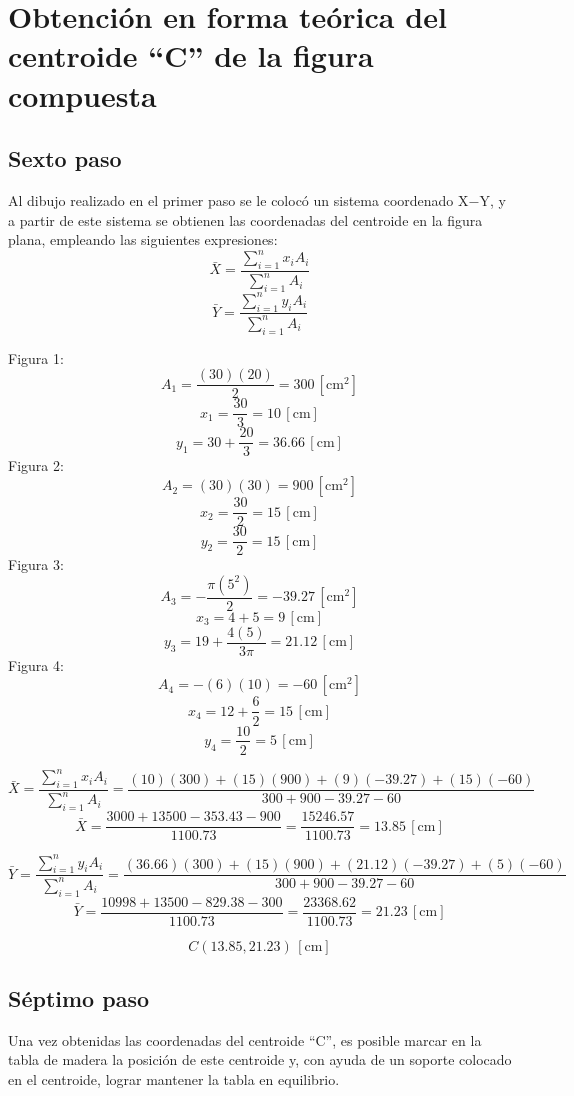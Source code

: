 \documentclass[12pt, titlepage]{report}
\newcommand{\unit}[1]{\ensuremath{\, \mathrm{#1}}}
\begin{document}
    \hfill
    \section{Obtención en forma teórica del centroide ``C'' de la figura compuesta}
    \subsection*{Sexto paso}
    Al dibujo realizado en el primer paso se le colocó un sistema coordenado X$-$Y, y a partir de este sistema se obtienen las coordenadas del centroide en la figura plana, empleando las siguientes expresiones:
    $$\bar{X}=\frac{\sum_{i= 1}^{n} x_{i}A_{i}}{\sum_{i= 1}^{n}A_{i}}$$
    $$\bar{Y}=\frac{\sum_{i= 1}^{n} y_{i}A_{i}}{\sum_{i= 1}^{n}A_{i}}$$

    Figura 1:
    $$A_{1}=\frac{(30)(20)}{2}=300 \unit{[cm^2]}$$
    $$x_{1}=\frac{30}{3}=10 \unit{[cm]}$$
    $$y_{1}=30+\frac{20}{3}=36.66 \unit{[cm]}$$
    Figura 2:
    $$A_{2}=(30)(30)=900\unit{[cm^2]}$$
    $$x_{2}=\frac{30}{2}=15 \unit{[cm]}$$
    $$y_{2}=\frac{30}{2}=15 \unit{[cm]}$$
    Figura 3:
    $$A_{3}=-\frac{\pi(5^2)}{2}=-39.27\unit{[cm^2]}$$
    $$x_{3}=4+5=9 \unit{[cm]}$$
    $$y_{3}=19+\frac{4(5)}{3\pi}=21.12 \unit{[cm]}$$
    Figura 4:
    $$A_{4}=-(6)(10)=-60\unit{[cm^2]}$$
    $$x_{4}=12+\frac{6}{2}=15 \unit{[cm]}$$
    $$y_{4}=\frac{10}{2}=5 \unit{[cm]}$$
    
    $$ \bar{X}=\frac{\sum_{i= 1}^{n} x_{i}A_{i}}{\sum_{i= 1}^{n}A_{i}} = \frac{(10)(300)+(15)(900)+(9)(-39.27)+(15)(-60)}{300+900-39.27-60}$$
    $$ \bar{X}=\frac{3000+13500-353.43-900}{1100.73}=\frac{15246.57}{1100.73}= 13.85 \unit{[cm]}$$
    
    $$ \bar{Y}=\frac{\sum_{i= 1}^{n} y_{i}A_{i}}{\sum_{i= 1}^{n}A_{i}} = \frac{(36.66)(300)+(15)(900)+(21.12)(-39.27)+(5)(-60)}{300+900-39.27-60}$$
    $$ \bar{Y}=\frac{10998+13500-829.38-300}{1100.73}=\frac{23368.62}{1100.73}=21.23 \unit{[cm]}$$

    $$C(13.85, 21.23) \unit{[cm]}$$

    \subsection*{Séptimo paso}
    Una vez obtenidas las coordenadas del centroide ``C'', es posible marcar en la tabla de madera la posición de este centroide y, con ayuda de un soporte colocado en el centroide, lograr mantener la tabla en equilibrio.
\end{document}
